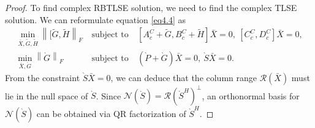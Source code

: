 \documentclass[preprint,11pt,3p]{elsarticle}
\newcommand\norm[1]{\left\lVert#1\right\rVert}
\begin{document}
\begin{proof}
	To find complex RBTLSE solution, we need to find the complex TLSE solution. We can reformulate equation \eqref{eq4.4} as
	\begin{eqnarray}
		\min_{ \bar{X}, \widetilde{G},\widetilde{H}} \norm{[\widetilde{G}, \widetilde{H}}_F ~ &\textrm{subject to}& ~ \left[A^C_c+\widetilde{G}, B^C_c+\widetilde{H}\right]\bar{X} =  0, ~ \left[C^C_c, D^C_c\right]\bar{X}=0, \nonumber \\
		\min_{ \bar{X}, \grave{G}} \norm{\grave{G}}_F ~ &\textrm{subject to}& ~ \left(\grave{P}+\grave{G} \right)\bar{X} =  0, ~ \grave{S}\bar{X}=0. \label{eqpf2.1} 
	\end{eqnarray}
	From the constraint $\grave{S} \bar{X} = 0$, we can deduce that the column range $\mathcal{R}(\bar{X})$ must lie in the null space of $\grave{S}$. Since $\mathcal{N}(\grave{S}) = \mathcal{R}(\grave{S}^H)^{\perp}$, an orthonormal basis for $\mathcal{N}(\grave{S})$ can be obtained via QR factorization of $\grave{S}^H$. 
	

\end{proof}
\end{document}
